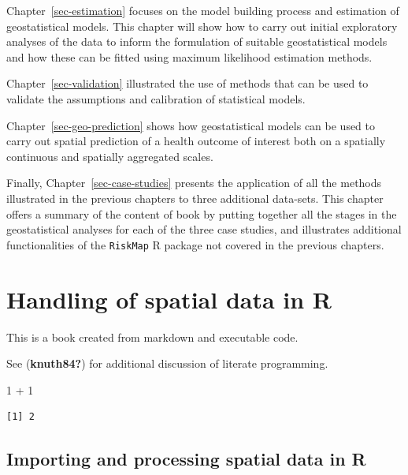 \documentclass[
  letterpaper,
]{krantz}
\newenvironment{Shaded}{\begin{snugshade}}{\end{snugshade}}
\newcommand{\DecValTok}[1]{\textcolor[rgb]{0.68,0.00,0.00}{#1}}
\newcommand{\SpecialCharTok}[1]{\textcolor[rgb]{0.37,0.37,0.37}{#1}}
\begin{document}
Chapter~\ref{sec-estimation} focuses on the model building process and
estimation of geostatistical models. This chapter will show how to carry
out initial exploratory analyses of the data to inform the formulation
of suitable geostatistical models and how these can be fitted using
maximum likelihood estimation methods.

Chapter~\ref{sec-validation} illustrated the use of methods that can be
used to validate the assumptions and calibration of statistical models.

Chapter~\ref{sec-geo-prediction} shows how geostatistical models can be
used to carry out spatial prediction of a health outcome of interest
both on a spatially continuous and spatially aggregated scales.

Finally, Chapter~\ref{sec-case-studies} presents the application of all
the methods illustrated in the previous chapters to three additional
data-sets. This chapter offers a summary of the content of book by
putting together all the stages in the geostatistical analyses for each
of the three case studies, and illustrates additional functionalities of
the \texttt{RiskMap} R package not covered in the previous chapters.


\hypertarget{sec-handling-data}{%
\chapter{Handling of spatial data in R}\label{sec-handling-data}}

This is a book created from markdown and executable code.

See (\textbf{knuth84?}) for additional discussion of literate
programming.

\begin{Shaded}
\begin{Highlighting}[]
\DecValTok{1} \SpecialCharTok{+} \DecValTok{1}
\end{Highlighting}
\end{Shaded}

\begin{verbatim}
[1] 2
\end{verbatim}

\hypertarget{importing-and-processing-spatial-data-in-r}{%
\section{Importing and processing spatial data in
R}\label{importing-and-processing-spatial-data-in-r}}
\end{document}
